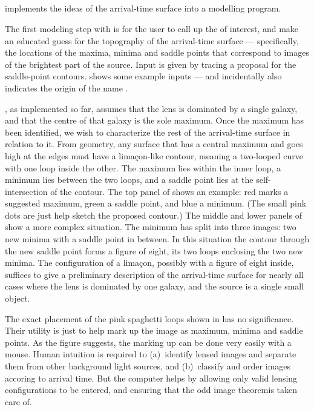 \subsection{\spl} \label{sec:SpaghettiLens}

\spl implements the ideas of the arrival-time surface into a modelling
program.

The first modeling step with \spl is for the user to call up the \sw
of interest, and make an educated guess for the topography of the
arrival-time surface --- specifically, the locations of the maxima,
minima and saddle points that correspond to images of the brightest
part of the source.  Input is given by tracing a proposal for the
saddle-point contours.   shows some example
inputs --- and incidentally also indicates the origin of the name
\spl.

\spl, as implemented so far, assumes that the lens is dominated by a
single galaxy, and that the centre of that galaxy is the sole maximum.
Once the maximum has been identified, we wish to characterize the rest
of the arrival-time surface in relation to it.  From geometry, any
surface that has a central maximum and goes high at the edges must
have a lima\c con-like contour, meaning a two-looped curve with one
loop inside the other.  The maximum lies within the inner loop, a
minimum lies between the two loops, and a saddle point lies at the
self-intersection of the contour.  The top panel of
 shows an example: red marks a suggested
maximum, green a saddle point, and blue a minimum.  (The small pink
dots are just help sketch the proposed contour.)  The middle and lower
panels of  show a more complex situation.
The minimum has split into three images: two new minima with a saddle
point in between.  In this situation the contour through the new
saddle point forms a figure of eight, its two loops enclosing the two
new minima.  The configuration of a lima\c con, possibly with a figure
of eight inside, suffices to give a preliminary description of the
arrival-time surface for nearly all cases where the lens is dominated
by one galaxy, and the source is a single small object.

The exact placement of the pink spaghetti loops shown in
 has no significance.  Their utility is
just to help mark up the image as maximum, minima and saddle points.
As the figure suggests, the marking up can be done very easily with a
mouse.  Human intuition is required to (a)~identify lensed images and
separate them from other background light sources, and (b)~classify
and order images accoring to arrival time.  But the computer helps by
allowing only valid lensing configurations to be entered, and ensuring
that the odd image theorem\needcite is taken care of.

